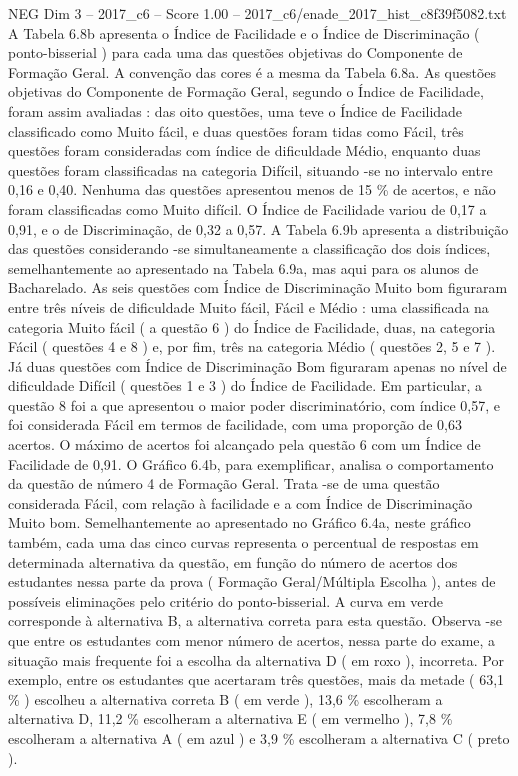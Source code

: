 \begin{textsample}{NEG Dim 3 – 2017\_c6 – Score 1.00 – 2017\_c6/enade\_2017\_hist\_c8f39f5082.txt}
A Tabela 6.8b apresenta o Índice de Facilidade e o Índice de Discriminação ( ponto-bisserial ) para cada uma das questões objetivas do Componente de Formação Geral.
A convenção das cores é a mesma da Tabela 6.8a.
As questões objetivas do Componente de Formação Geral, segundo o Índice de Facilidade, foram assim avaliadas : das oito questões, uma teve o Índice de Facilidade classificado como Muito fácil, e duas questões foram tidas como Fácil, três questões foram consideradas com índice de dificuldade Médio, enquanto duas questões foram classificadas na categoria Difícil, situando -se no intervalo entre 0,16 e 0,40.
Nenhuma das questões apresentou menos de 15 \% de acertos, e não foram classificadas como Muito difícil.
O Índice de Facilidade variou de 0,17 a 0,91, e o de Discriminação, de 0,32 a 0,57.
A Tabela 6.9b apresenta a distribuição das questões considerando -se simultaneamente a classificação dos dois índices, semelhantemente ao apresentado na Tabela 6.9a, mas aqui para os alunos de Bacharelado.
As seis questões com Índice de Discriminação Muito bom figuraram entre três níveis de dificuldade Muito fácil, Fácil e Médio : uma classificada na categoria Muito fácil ( a questão 6 ) do Índice de Facilidade, duas, na categoria Fácil ( questões 4 e 8 ) e, por fim, três na categoria Médio ( questões 2, 5 e 7 ).
Já duas questões com Índice de Discriminação Bom figuraram apenas no nível de dificuldade Difícil ( questões 1 e 3 ) do Índice de Facilidade.
Em particular, a questão 8 foi a que apresentou o maior poder discriminatório, com índice 0,57, e foi considerada Fácil em termos de facilidade, com uma proporção de 0,63 acertos.
O máximo de acertos foi alcançado pela questão 6 com um Índice de Facilidade de 0,91.
O Gráfico 6.4b, para exemplificar, analisa o comportamento da questão de número 4 de Formação Geral.
Trata -se de uma questão considerada Fácil, com relação à facilidade e a com Índice de Discriminação Muito bom.
Semelhantemente ao apresentado no Gráfico 6.4a, neste gráfico também, cada uma das cinco curvas representa o percentual de respostas em determinada alternativa da questão, em função do número de acertos dos estudantes nessa parte da prova ( Formação Geral/Múltipla Escolha ), antes de possíveis eliminações pelo critério do ponto-bisserial.
A curva em verde corresponde à alternativa B, a alternativa correta para esta questão.
Observa -se que entre os estudantes com menor número de acertos, nessa parte do exame, a situação mais frequente foi a escolha da alternativa D ( em roxo ), incorreta.
Por exemplo, entre os estudantes que acertaram três questões, mais da metade ( 63,1 \% ) escolheu a alternativa correta B ( em verde ), 13,6 \% escolheram a alternativa D, 11,2 \% escolheram a alternativa E ( em vermelho ), 7,8 \% escolheram a alternativa A ( em azul ) e 3,9 \% escolheram a alternativa C ( preto ).

\end{textsample}
